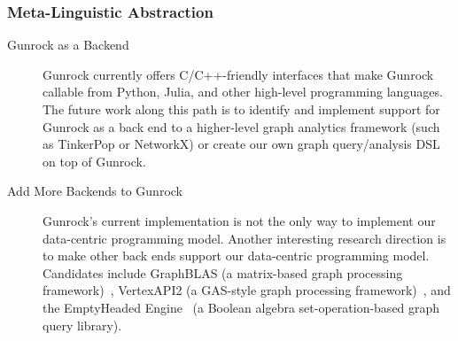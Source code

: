 \documentclass[format=acmsmall,review=false,screen=true]{acmart}
\begin{document}
\subsubsection{Meta-Linguistic Abstraction}
\begin{description}
\item[Gunrock as a Backend] Gunrock currently offers C/C++-friendly
  interfaces that make Gunrock callable from Python, Julia, and other
  high-level programming languages. The future work along this path is
  to identify and implement support for Gunrock as a back end to a
  higher-level graph analytics framework (such as TinkerPop or
  NetworkX) or create our own graph query/analysis DSL on top of
  Gunrock.
\item[Add More Backends to Gunrock] Gunrock's current implementation
  is not the only way to implement our data-centric programming model.
  Another interesting research direction is to make other back ends
  support our data-centric programming model. Candidates include
  GraphBLAS (a matrix-based graph processing
  framework)~\cite{Kepner:2016:MFO}, VertexAPI2 (a GAS-style graph
  processing framework)~\cite{Elsen:2013:AVC}, and the EmptyHeaded
  Engine~\cite{Aberger:2015:EBA} (a Boolean algebra
  set-operation-based graph query library).
\end{description}
\end{document}
